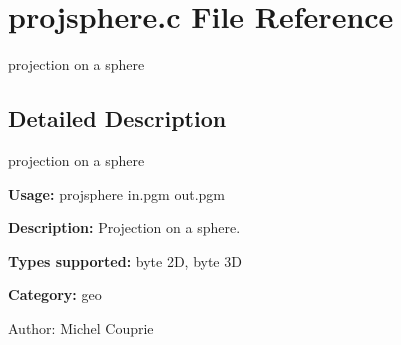 \section{projsphere.c File Reference}
\label{projsphere_8c}
projection on a sphere  




\label{_details}
\subsection{Detailed Description}
projection on a sphere 

{\bf Usage:} projsphere in.pgm out.pgm

{\bf Description:} Projection on a sphere.

{\bf Types supported:} byte 2D, byte 3D

{\bf Category:} geo

\begin{Desc}
\item[Author:]Michel Couprie \end{Desc}
